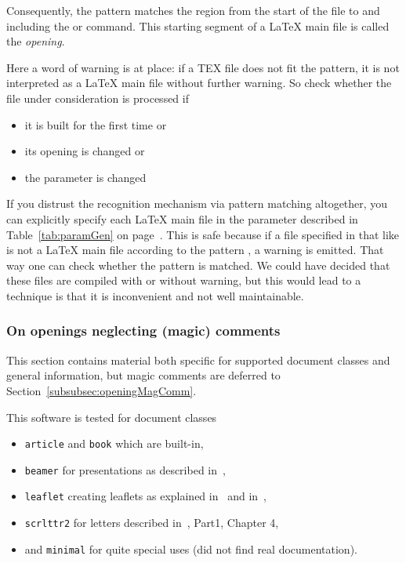 Consequently, the pattern matches the region from the start of the file 
to and including the  or  command. 
This starting segment of a \LaTeX{} main file 
is called the \textit{opening}. 

Here a word of warning is at place: if a TEX file does not fit the pattern, 
it is not interpreted as a \LaTeX{} main file without further warning. 
So check whether the file under consideration is processed if 
%
\begin{itemize}
  \item 
  it is built for the first time or 
  \item 
  its opening  is changed or
  \item 
  the parameter  is changed 
\end{itemize}
%
If you distrust the recognition mechanism via pattern matching altogether, 
you can explicitly specify each \LaTeX{} main file 
in the parameter  
described in Table~\ref{tab:paramGen} on page~\pageref{tab:paramGen}. 
This is safe because if a file specified in  
that like is not a \LaTeX{} main file according to the pattern , 
a warning is emitted. 
That way one can check whether the pattern is matched. 
We could have decided that these files are compiled with or without warning, 
but this would lead to a technique is that it is inconvenient and not well maintainable. 


\subsubsection{On openings neglecting (magic) comments}\label{subsubsec:openingNoMagComm}

This section contains material both specific for supported document classes 
and general information, 
but magic comments are deferred to Section~\ref{subsubsec:openingMagComm}. 

This software is tested for document classes 
%
\begin{itemize}
  \item \texttt{article} and \texttt{book} which are built-in, 
  \item \texttt{beamer} for presentations as described in~\cite{Beamer}, 
  \item \texttt{leaflet} creating leaflets as explained in~\cite{Leaflet} and in~\cite{LeafletMan}, 
  \item \texttt{scrlttr2} for letters described in~\cite{KomaAnl23}, Part1, Chapter 4, 
  \item and \texttt{minimal} for quite special uses (did not find real documentation). 
\end{itemize}


